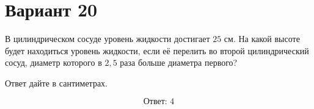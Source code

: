 \documentclass[12pt,a4paper]{article}
\begin{document}
\section*{Вариант 20}

В цилиндрическом сосуде уровень жидкости достигает \(25\) см.
На какой высоте будет находиться уровень жидкости, если её перелить
во второй цилиндрический сосуд, диаметр которого в \(2{,}5\) раза
больше диаметра первого?

Ответ дайте в сантиметрах.

\begin{center}
\end{center}

\[
\boxed{\text{Ответ: }4}
\]
\end{document}
